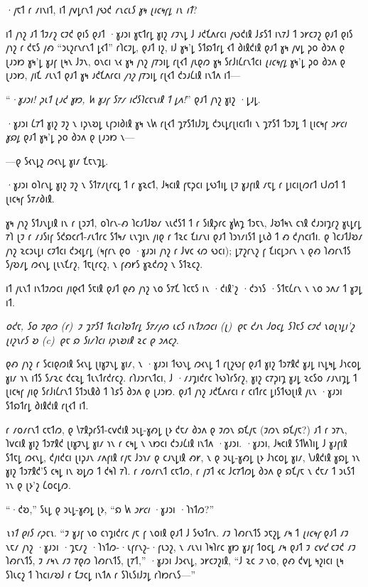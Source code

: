 ·𐑢𐑱𐑑 𐑩 𐑥𐑦𐑯𐑦𐑑, 𐑦𐑑 𐑢𐑫𐑛𐑩𐑯𐑑 𐑢𐑻𐑒 \emph{𐑩𐑯𐑤𐑧𐑕 𐑣𐑰 𐑚𐑦𐑤𐑰𐑝𐑛 𐑦𐑯 𐑦𐑑}?

𐑦𐑑 𐑢𐑪𐑟 𐑨𐑑 𐑑𐑲𐑥𐑟 𐑤𐑲𐑒 𐑞𐑦𐑕 𐑞𐑨𐑑 ·𐑣𐑨𐑮𐑦 𐑣𐑱𐑑𐑩𐑛 𐑣𐑦𐑟 𐑥𐑲𐑯𐑛 𐑓 𐑨𐑒𐑗𐑵𐑩𐑤𐑦 𐑢𐑻𐑒𐑦𐑙 𐑓𐑭𐑕𐑑 𐑦𐑯𐑳𐑓 𐑑 𐑮𐑾𐑤𐑲𐑟 𐑞𐑨𐑑 𐑞𐑦𐑕 𐑢𐑪𐑟 𐑩 𐑒𐑱𐑕 𐑢𐑺 “𐑮𐑧𐑟𐑩𐑯𐑩𐑯𐑑 𐑛𐑬𐑑” 𐑩𐑐𐑤𐑲𐑛, 𐑞𐑨𐑑 𐑦𐑟, 𐑦𐑓 𐑣𐑰'𐑛 𐑕𐑑𐑸𐑑𐑩𐑛 𐑬𐑑 𐑔𐑦𐑙𐑒𐑦𐑙 𐑞𐑨𐑑 𐑣𐑰 𐑢𐑫𐑛 𐑜𐑴 𐑔𐑮𐑵 𐑞 𐑚𐑨𐑮𐑽 𐑣𐑰'𐑛 𐑣𐑨𐑝 𐑚𐑰𐑯 𐑓𐑲𐑯, 𐑴𐑯𐑤𐑦 𐑯𐑬 𐑣𐑰 𐑢𐑪𐑟 𐑢𐑳𐑮𐑦𐑛 𐑩𐑚𐑬𐑑 𐑢𐑧𐑞𐑼 𐑣𐑰 𐑕𐑩𐑓𐑦𐑖𐑩𐑯𐑑𐑤𐑦 \emph{𐑚𐑦𐑤𐑰𐑝𐑛} 𐑣𐑰'𐑛 𐑜𐑴 𐑔𐑮𐑵 𐑞 𐑚𐑨𐑮𐑽, 𐑢𐑦𐑗 𐑥𐑧𐑯𐑑 𐑞𐑨𐑑 𐑣𐑰 𐑨𐑒𐑗𐑵𐑩𐑤𐑦 \emph{𐑢𐑪𐑟} 𐑢𐑳𐑮𐑦𐑛 𐑩𐑚𐑬𐑑 𐑒𐑮𐑨𐑖𐑦𐑙 𐑦𐑯𐑑𐑵 𐑦𐑑—

“\emph{·𐑣𐑨𐑮𐑦! 𐑜𐑧𐑑 𐑚𐑨𐑒 𐑣𐑽, 𐑿 𐑣𐑨𐑝 𐑕𐑳𐑥 𐑦𐑒𐑕𐑐𐑤𐑱𐑯𐑦𐑙 𐑑 𐑛𐑵!}” 𐑞𐑨𐑑 𐑢𐑪𐑟 𐑣𐑦𐑟 ·𐑛𐑨𐑛.

·𐑣𐑨𐑮𐑦 𐑖𐑳𐑑 𐑣𐑦𐑟 𐑲𐑟 𐑯 𐑦𐑜𐑯𐑹𐑛 𐑧𐑝𐑮𐑦𐑔𐑦𐑙 𐑣𐑰 𐑯𐑿 𐑩𐑚𐑬𐑑 𐑡𐑳𐑕𐑑𐑦𐑓𐑲𐑛 𐑒𐑮𐑧𐑛𐑩𐑚𐑦𐑤𐑦𐑑𐑦 𐑯 𐑡𐑳𐑕𐑑 𐑑𐑮𐑲𐑛 𐑑 𐑚𐑦𐑤𐑰𐑝 \emph{𐑮𐑾𐑤𐑦 𐑣𐑸𐑛} 𐑞𐑨𐑑 𐑣𐑰'𐑛 𐑜𐑴 𐑔𐑮𐑵 𐑞 𐑚𐑨𐑮𐑽 𐑯—

—𐑞 𐑕𐑬𐑯𐑛𐑟 𐑼𐑬𐑯𐑛 𐑣𐑦𐑥 𐑗𐑱𐑯𐑡𐑛.

·𐑣𐑨𐑮𐑦 𐑴𐑐𐑩𐑯𐑛 𐑣𐑦𐑟 𐑲𐑟 𐑯 𐑕𐑑𐑳𐑥𐑚𐑩𐑤𐑛 𐑑 𐑩 𐑣𐑷𐑤𐑑, 𐑓𐑰𐑤𐑦𐑙 𐑝𐑱𐑜𐑤𐑦 𐑛𐑻𐑑𐑦𐑛 𐑚𐑲 𐑣𐑨𐑝𐑦𐑙 𐑥𐑱𐑛 𐑩 𐑛𐑦𐑤𐑦𐑚𐑼𐑩𐑑 𐑧𐑓𐑼𐑑 𐑑 𐑚𐑦𐑤𐑰𐑝 𐑕𐑳𐑥𐑔𐑦𐑙.

𐑣𐑰 𐑢𐑪𐑟 𐑕𐑑𐑨𐑯𐑛𐑦𐑙 𐑦𐑯 𐑩 𐑚𐑮𐑲𐑑, 𐑴𐑐𐑩𐑯-𐑺 𐑐𐑤𐑨𐑑𐑓𐑹𐑥 𐑯𐑧𐑒𐑕𐑑 𐑑 𐑩 𐑕𐑦𐑙𐑜𐑩𐑤 𐑣𐑿𐑡 𐑑𐑮𐑱𐑯, 𐑓𐑹𐑑𐑰𐑯 𐑤𐑪𐑙 𐑒𐑨𐑮𐑦𐑡𐑩𐑟 𐑣𐑧𐑛𐑩𐑛 𐑳𐑐 𐑚𐑲 𐑩 𐑥𐑨𐑕𐑦𐑝 𐑕𐑒𐑸𐑤𐑩𐑑-𐑥𐑧𐑑𐑩𐑤 𐑕𐑑𐑰𐑥 𐑧𐑯𐑡𐑦𐑯 𐑢𐑦𐑞 𐑩 𐑑𐑷𐑤 𐑗𐑦𐑥𐑯𐑦 𐑞𐑨𐑑 𐑐𐑮𐑪𐑥𐑦𐑕𐑑 𐑛𐑧𐑔 𐑑 𐑺 𐑒𐑢𐑪𐑤𐑦𐑑𐑦. 𐑞 𐑐𐑤𐑨𐑑𐑓𐑹𐑥 𐑢𐑪𐑟 𐑷𐑤𐑮𐑧𐑛𐑦 𐑤𐑲𐑑𐑤𐑦 𐑒𐑮𐑬𐑛𐑩𐑛 (𐑰𐑝𐑩𐑯 𐑞𐑴 ·𐑣𐑨𐑮𐑦 𐑢𐑪𐑟 𐑩 𐑓𐑫𐑤 𐑬𐑼 𐑻𐑤𐑦); 𐑛𐑳𐑟𐑩𐑯𐑟 𐑝 𐑗𐑦𐑤𐑛𐑮𐑩𐑯 𐑯 𐑞𐑺 𐑐𐑺𐑩𐑯𐑑𐑕 𐑕𐑢𐑹𐑥𐑛 𐑼𐑬𐑯𐑛 𐑚𐑧𐑯𐑗𐑩𐑟, 𐑑𐑱𐑚𐑩𐑤𐑟, 𐑯 𐑝𐑺𐑾𐑕 𐑣𐑷𐑒𐑼𐑟 𐑯 𐑕𐑑𐑷𐑤𐑟.

𐑦𐑑 𐑢𐑧𐑯𐑑 𐑦𐑯𐑑𐑲𐑼𐑤𐑦 𐑢𐑦𐑞𐑬𐑑 𐑕𐑱𐑦𐑙 𐑞𐑨𐑑 𐑞𐑺 𐑢𐑪𐑟 𐑯𐑴 𐑕𐑳𐑗 𐑐𐑤𐑱𐑕 𐑦𐑯 ·𐑒𐑦𐑙'𐑟 ·𐑒𐑮𐑪𐑕 ·𐑕𐑑𐑱𐑖𐑩𐑯 𐑯 𐑯𐑴 𐑮𐑵𐑥 𐑑 𐑣𐑲𐑛 𐑦𐑑.

\emph{𐑴𐑒𐑱, 𐑕𐑴 𐑲𐑞𐑼 (𐑩)~𐑲 𐑡𐑳𐑕𐑑 𐑑𐑧𐑤𐑦𐑐𐑹𐑑𐑩𐑛 𐑕𐑳𐑥𐑢𐑺 𐑧𐑤𐑕 𐑦𐑯𐑑𐑲𐑼𐑤𐑦 (𐑚)~𐑞𐑱 𐑒𐑨𐑯 𐑓𐑴𐑤𐑛 𐑕𐑐𐑱𐑕 𐑤𐑲𐑒 𐑯𐑴𐑚𐑪𐑛𐑦'𐑟 𐑚𐑦𐑟𐑯𐑩𐑕 𐑹 (c)~𐑞𐑱 𐑸 𐑕𐑦𐑥𐑐𐑤𐑦 𐑦𐑜𐑯𐑹𐑦𐑙 𐑷𐑤 𐑞 𐑮𐑵𐑤𐑟.}

𐑞𐑺 𐑢𐑪𐑟 𐑩 𐑕𐑤𐑦𐑞𐑼𐑦𐑙 𐑕𐑬𐑯𐑛 𐑚𐑦𐑣𐑲𐑯𐑛 𐑣𐑦𐑥, 𐑯 ·𐑣𐑨𐑮𐑦 𐑑𐑻𐑯𐑛 𐑼𐑬𐑯𐑛 𐑑 𐑩𐑚𐑟𐑻𐑝 𐑞𐑨𐑑 𐑣𐑦𐑟 𐑑𐑮𐑳𐑙𐑒 𐑣𐑨𐑛 𐑦𐑯𐑛𐑰𐑛 𐑓𐑪𐑤𐑴𐑛 𐑣𐑦𐑥 𐑪𐑯 𐑦𐑑𐑕 𐑕𐑥𐑷𐑤 𐑒𐑤𐑷𐑛 𐑑𐑧𐑯𐑑𐑩𐑒𐑩𐑤𐑟. 𐑩𐑐𐑨𐑮𐑩𐑯𐑑𐑤𐑦, 𐑓 ·𐑥𐑨𐑡𐑦𐑒𐑩𐑤 𐑐𐑻𐑐𐑩𐑕𐑩𐑟, 𐑣𐑦𐑟 𐑤𐑳𐑜𐑦𐑡 𐑣𐑨𐑛 𐑷𐑤𐑕𐑴 𐑥𐑨𐑯𐑦𐑡𐑛 𐑑 𐑚𐑦𐑤𐑰𐑝 𐑢𐑦𐑞 𐑕𐑩𐑓𐑦𐑖𐑩𐑯𐑑 𐑕𐑑𐑮𐑧𐑙𐑔 𐑑 𐑐𐑭𐑕 𐑔𐑮𐑵 𐑞 𐑚𐑨𐑮𐑽. 𐑞𐑨𐑑 𐑢𐑪𐑟 𐑨𐑒𐑗𐑵𐑩𐑤𐑦 𐑩 𐑤𐑦𐑑𐑩𐑤 𐑛𐑦𐑕𐑑𐑻𐑚𐑦𐑙 𐑢𐑧𐑯 ·𐑣𐑨𐑮𐑦 𐑕𐑑𐑸𐑑𐑩𐑛 𐑔𐑦𐑙𐑒𐑦𐑙 𐑩𐑚𐑬𐑑 𐑦𐑑.

𐑩 𐑥𐑴𐑥𐑩𐑯𐑑 𐑤𐑱𐑑𐑼, 𐑞 𐑘𐑳𐑙𐑜𐑩𐑕𐑑-𐑤𐑫𐑒𐑦𐑙 𐑮𐑧𐑛-𐑣𐑺𐑛 𐑚𐑶 𐑒𐑱𐑥 𐑔𐑮𐑵 𐑞 𐑲𐑼𐑯 𐑸𐑗𐑢𐑱 (𐑲𐑼𐑯 𐑸𐑗𐑢𐑱?) 𐑨𐑑 𐑩 𐑮𐑳𐑯, 𐑐𐑫𐑤𐑦𐑙 𐑣𐑦𐑟 𐑑𐑮𐑳𐑙𐑒 𐑚𐑦𐑣𐑲𐑯𐑛 𐑣𐑦𐑥 𐑪𐑯 𐑩 𐑤𐑰𐑛 𐑯 𐑯𐑽𐑤𐑦 𐑒𐑮𐑨𐑖𐑦𐑙 𐑦𐑯𐑑𐑵 ·𐑣𐑨𐑮𐑦. ·𐑣𐑨𐑮𐑦, 𐑓𐑰𐑤𐑦𐑙 𐑕𐑑𐑿𐑐𐑦𐑛 𐑓 𐑣𐑨𐑝𐑦𐑙 𐑕𐑑𐑱𐑛 𐑼𐑬𐑯𐑛, 𐑒𐑢𐑦𐑒𐑤𐑦 𐑚𐑦𐑜𐑨𐑯 𐑥𐑵𐑝𐑦𐑙 𐑩𐑢𐑱 𐑓𐑮𐑪𐑥 𐑞 𐑤𐑨𐑯𐑛𐑦𐑙 𐑺𐑾, 𐑯 𐑞 𐑮𐑧𐑛-𐑣𐑺𐑛 𐑚𐑶 𐑓𐑪𐑤𐑴𐑛 𐑣𐑦𐑥, 𐑘𐑨𐑙𐑒𐑦𐑙 𐑣𐑸𐑛 𐑪𐑯 𐑣𐑦𐑟 𐑑𐑮𐑳𐑙𐑒'𐑕 𐑤𐑰𐑛 𐑦𐑯 𐑹𐑛𐑼 𐑑 𐑒𐑰𐑐 𐑳𐑐. 𐑩 𐑥𐑴𐑥𐑩𐑯𐑑 𐑤𐑱𐑑𐑼, 𐑩 𐑢𐑲𐑑 𐑬𐑤 𐑓𐑤𐑳𐑑𐑼𐑛 𐑔𐑮𐑵 𐑞 𐑸𐑗𐑢𐑱 𐑯 𐑒𐑱𐑥 𐑑 𐑮𐑧𐑕𐑑 𐑪𐑯 𐑞 𐑚𐑶'𐑟 𐑖𐑴𐑤𐑛𐑼.

“·𐑒𐑹,” 𐑕𐑧𐑛 𐑞 𐑮𐑧𐑛-𐑣𐑺𐑛 𐑚𐑶, “𐑸 𐑿 \emph{𐑮𐑾𐑤𐑦} ·𐑣𐑨𐑮𐑦 ·𐑐𐑪𐑑𐑼?”

\emph{𐑯𐑪𐑑 𐑞𐑦𐑕 𐑩𐑜𐑱𐑯.} “𐑲 𐑣𐑨𐑝 𐑯𐑴 𐑤𐑪𐑡𐑦𐑒𐑩𐑤 𐑢𐑱 𐑝 𐑯𐑴𐑦𐑙 𐑞𐑨𐑑 𐑓 𐑕𐑻𐑑𐑩𐑯. 𐑥𐑲 𐑐𐑺𐑩𐑯𐑑𐑕 𐑮𐑱𐑟𐑛 𐑥𐑰 𐑑 \emph{𐑚𐑦𐑤𐑰𐑝} 𐑞𐑨𐑑 𐑥𐑲 𐑯𐑱𐑥 𐑢𐑪𐑟 ·𐑣𐑨𐑮𐑦 ·𐑡𐑱𐑥𐑟 ·𐑐𐑪𐑑𐑼-·𐑧𐑝𐑩𐑯𐑟-·𐑝𐑧𐑮𐑟, 𐑯 𐑥𐑧𐑯𐑦 𐑐𐑰𐑐𐑩𐑤 𐑣𐑽 𐑣𐑨𐑝 𐑑𐑴𐑤𐑛 𐑥𐑰 𐑞𐑨𐑑 𐑲 \emph{𐑤𐑫𐑒} 𐑤𐑲𐑒 𐑥𐑲 𐑐𐑺𐑩𐑯𐑑𐑕, 𐑲 𐑥𐑰𐑯 𐑥𐑲 𐑳𐑞𐑼 𐑐𐑺𐑩𐑯𐑑𐑕, 𐑚𐑳𐑑,” ·𐑣𐑨𐑮𐑦 𐑓𐑮𐑬𐑯𐑛, 𐑮𐑾𐑤𐑲𐑟𐑦𐑙, “𐑓 𐑷𐑤 \emph{𐑲} 𐑯𐑴, 𐑞𐑺 𐑒𐑫𐑛 𐑰𐑟𐑦𐑤𐑦 𐑚𐑰 𐑕𐑐𐑧𐑤𐑟 𐑑 𐑐𐑪𐑤𐑦𐑥𐑹𐑓 𐑩 𐑗𐑲𐑤𐑛 𐑦𐑯𐑑𐑵 𐑩 𐑕𐑐𐑧𐑕𐑦𐑓𐑲𐑛 𐑩𐑐𐑽𐑩𐑯𐑕—”

